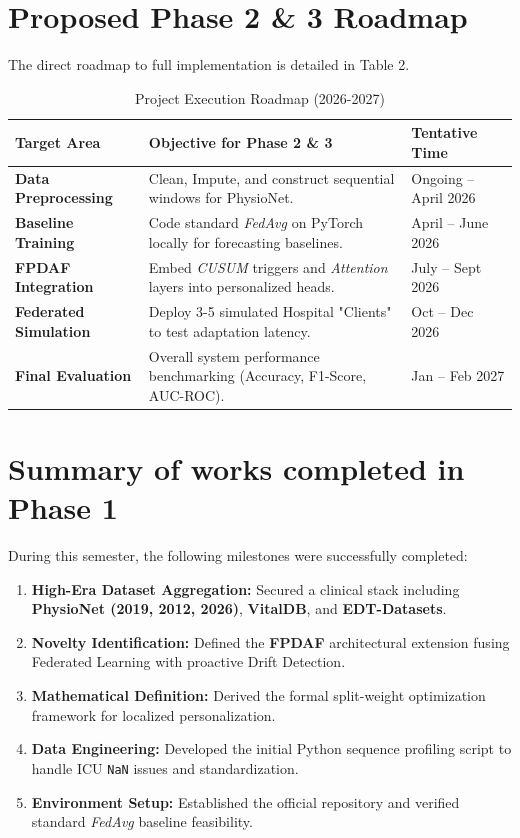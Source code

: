 \documentclass[11pt, a4paper]{article}
\begin{document}
\section{Proposed Phase 2 \& 3 Roadmap}
The direct roadmap to full implementation is detailed in Table 2.

\begin{table}[H]
\centering
\small
\begin{tabular}{|p{3cm}|p{8.5cm}|p{3.5cm}|}
\hline
\textbf{Target Area} & \textbf{Objective for Phase 2 \& 3} & \textbf{Tentative Time} \\
\hline
\textbf{Data Preprocessing} & Clean, Impute, and construct sequential windows for PhysioNet. & Ongoing -- April 2026 \\
\hline
\textbf{Baseline Training} & Code standard \textit{FedAvg} on PyTorch locally for forecasting baselines. & April -- June 2026 \\
\hline
\textbf{FPDAF Integration} & Embed \textit{CUSUM} triggers and \textit{Attention} layers into personalized heads. & July -- Sept 2026 \\
\hline
\textbf{Federated Simulation} & Deploy 3-5 simulated Hospital "Clients" to test adaptation latency. & Oct -- Dec 2026 \\
\hline
\textbf{Final Evaluation} & Overall system performance benchmarking (Accuracy, F1-Score, AUC-ROC). & Jan -- Feb 2027 \\
\hline
\end{tabular}
\caption{Project Execution Roadmap (2026-2027)}
\end{table}

\section{Summary of works completed in Phase 1}
During this semester, the following milestones were successfully completed:
\begin{enumerate}[noitemsep, leftmargin=1.5em]
    \item \textbf{High-Era Dataset Aggregation:} Secured a clinical stack including \textbf{PhysioNet (2019, 2012, 2026)}, \textbf{VitalDB}, and \textbf{EDT-Datasets}.
    \item \textbf{Novelty Identification:} Defined the \textbf{FPDAF} architectural extension fusing Federated Learning with proactive Drift Detection.
    \item \textbf{Mathematical Definition:} Derived the formal split-weight optimization framework for localized personalization.
    \item \textbf{Data Engineering:} Developed the initial Python sequence profiling script to handle ICU \texttt{NaN} issues and standardization.
    \item \textbf{Environment Setup:} Established the official repository and verified standard \textit{FedAvg} baseline feasibility.
\end{enumerate}
\end{document}

